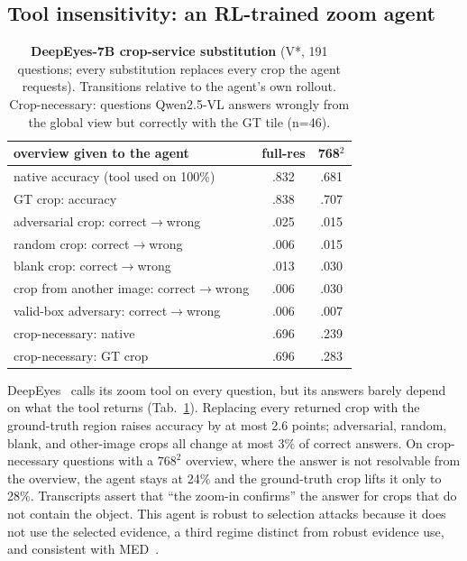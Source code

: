 \documentclass[10pt,twocolumn,letterpaper]{article}
\begin{document}
\subsection{Tool insensitivity: an RL-trained zoom agent}
\begin{table}[t]\centering\small
\caption{\textbf{DeepEyes-7B crop-service substitution} (V*, 191 questions; every substitution replaces every crop the agent requests). Transitions relative to the agent's own rollout. Crop-necessary: questions Qwen2.5-VL answers wrongly from the global view but correctly with the GT tile (n=46).}\label{tab:deepeyes}
\setlength{\tabcolsep}{3pt}
\begin{tabular}{@{}lcc@{}}\toprule
overview given to the agent & full-res & 768$^2$\\\midrule
native accuracy (tool used on 100\%) & .832 & .681\\
GT crop: accuracy & .838 & .707\\
adversarial crop: correct$\to$wrong & .025 & .015\\
random crop: correct$\to$wrong & .006 & .015\\
blank crop: correct$\to$wrong & .013 & .030\\
crop from another image: correct$\to$wrong & .006 & .030\\
valid-box adversary: correct$\to$wrong & .006 & .007\\\midrule
crop-necessary: native & .696 & .239\\
crop-necessary: GT crop & .696 & .283\\\bottomrule
\end{tabular}\end{table}

DeepEyes~\cite{zheng2025deepeyes} calls its zoom tool on every question, but its answers barely depend on what the tool returns (Tab.~\ref{tab:deepeyes}). Replacing every returned crop with the ground-truth region raises accuracy by at most 2.6 points; adversarial, random, blank, and other-image crops all change at most 3\% of correct answers. On crop-necessary questions with a $768^2$ overview, where the answer is not resolvable from the overview, the agent stays at 24\% and the ground-truth crop lifts it only to 28\%. Transcripts assert that ``the zoom-in confirms'' the answer for crops that do not contain the object. This agent is robust to selection attacks because it does not use the selected evidence, a third regime distinct from robust evidence use, and consistent with MED~\cite{med2026}.
\end{document}
